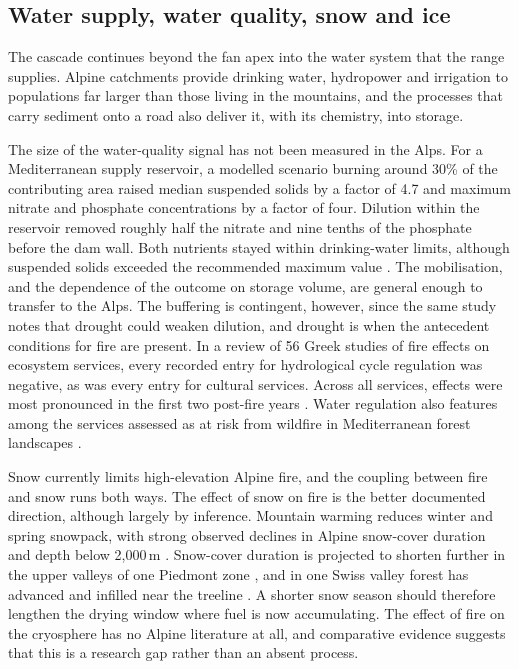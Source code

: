 \documentclass[11pt,a4paper]{article}
\begin{document}
\subsection{Water supply, water quality, snow and ice}

The cascade continues beyond the fan apex into the water system that the range supplies. Alpine catchments provide drinking water, hydropower and irrigation to populations far larger than those living in the mountains, and the processes that carry sediment onto a road also deliver it, with its chemistry, into storage.

The size of the water-quality signal has not been measured in the Alps. For a Mediterranean supply reservoir, a modelled scenario burning around 30\% of the contributing area raised median suspended solids by a factor of 4.7 and maximum nitrate and phosphate concentrations by a factor of four. Dilution within the reservoir removed roughly half the nitrate and nine tenths of the phosphate before the dam wall. Both nutrients stayed within drinking-water limits, although suspended solids exceeded the recommended maximum value \citep{basso_potential_2021}. The mobilisation, and the dependence of the outcome on storage volume, are general enough to transfer to the Alps. The buffering is contingent, however, since the same study notes that drought could weaken dilution, and drought is when the antecedent conditions for fire are present. In a review of 56 Greek studies of fire effects on ecosystem services, every recorded entry for hydrological cycle regulation was negative, as was every entry for cultural services. Across all services, effects were most pronounced in the first two post-fire years \citep{misseyanni_impact_2025}. Water regulation also features among the services assessed as at risk from wildfire in Mediterranean forest landscapes \citep{lecinadiaz_assessing_2021}.

Snow currently limits high-elevation Alpine fire, and the coupling between fire and snow runs both ways. The effect of snow on fire is the better documented direction, although largely by inference. Mountain warming reduces winter and spring snowpack, with strong observed declines in Alpine snow-cover duration and depth below 2{,}000\,m \citep{rangwala_climate_2012, pepin_climate_2022}. Snow-cover duration is projected to shorten further in the upper valleys of one Piedmont zone \citep{pede_mountain_2022}, and in one Swiss valley forest has advanced and infilled near the treeline \citep{frei_evidence_2023}. A shorter snow season should therefore lengthen the drying window where fuel is now accumulating. The effect of fire on the cryosphere has no Alpine literature at all, and comparative evidence suggests that this is a research gap rather than an absent process.
\end{document}
